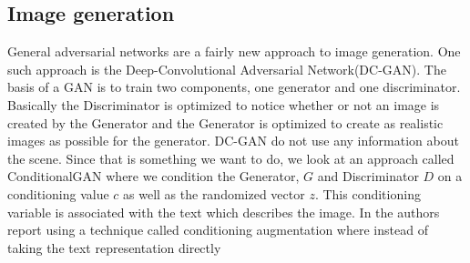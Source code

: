 \documentclass[../main.tex]{subfiles}
\begin{document}
\subsection{Image generation}
General adversarial networks are a fairly new approach to image generation. One such approach is the Deep-Convolutional Adversarial Network(DC-GAN)\cite{radford2015dcgan}. The basis of a GAN is to train two components, one generator and one discriminator. Basically the Discriminator is optimized to notice whether or not an image is created by the Generator and the Generator is optimized to create as realistic images as possible for the generator. DC-GAN do not use any information about the scene. Since that is something we want to do, we look at an approach called ConditionalGAN  \cite{mirza2014conditionalgan} where we condition the Generator, $G$ and Discriminator $D$ on a conditioning value $c$ as well as the randomized vector $z$. This conditioning variable is associated with the text which describes the image. In \cite{zhang2017stackgan} the authors report using a technique called conditioning augmentation where instead of taking the text representation directly 
\end{document}
